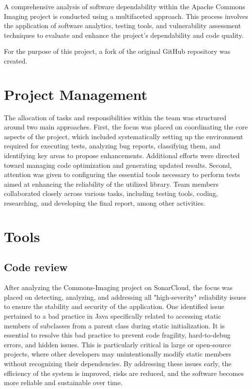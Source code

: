 \documentclass[sigconf]{acmart}
\begin{document}
A comprehensive analysis of software dependability within the Apache Commons Imaging project is conducted using a multifaceted approach. This process involves the application of software analytics, testing tools, and vulnerability assessment techniques to evaluate and enhance the project's dependability and code quality.

For the purpose of this project, a fork \cite{commons-imaging} of the original GitHub repository was created. 


\section{Project Management}
The allocation of tasks and responsibilities within the team was structured around two main approaches.
First, the focus was placed on coordinating the core aspects of the project, which included systematically setting up the environment required for executing tests, analyzing bug reports, classifying them, and identifying key areas to propose enhancements. Additional efforts were directed toward managing code optimization and generating updated results.
Second, attention was given to configuring the essential tools necessary to perform tests aimed at enhancing the reliability of the utilized library.
Team members collaborated closely across various tasks, including testing tools, coding, researching, and developing the final report, among other activities.

\section{Tools}

\subsection{Code review}
After analyzing the Commons-Imaging project on SonarCloud, the focus was placed on detecting, analyzing, and addressing all "high-severity" reliability issues to ensure the stability and security of the application. One identified issue pertained to a bad practice in Java \cite{Java_SE_Specifications} specifically related to accessing static members of subclasses from a parent class during static initialization.
It is essential to resolve this bad practice to prevent code fragility, hard-to-debug errors, and hidden issues. This is particularly critical in large or open-source projects, where other developers may unintentionally modify static members without recognizing their dependencies.
By addressing these issues early, the efficiency of the system is improved, risks are reduced, and the software becomes more reliable and sustainable over time.
\end{document}

